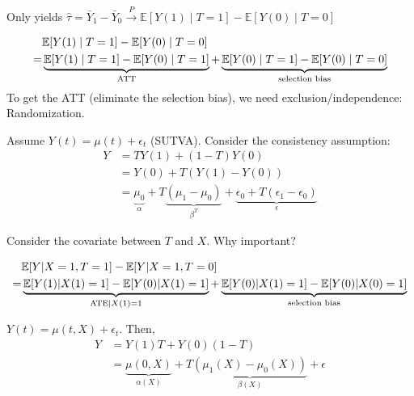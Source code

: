 \documentclass[11pt]{elegantbook}
\begin{document}
Only yields $\hat{\tau}=\bar{Y}_1-\bar{Y}_0\stackrel{P}{\longrightarrow} \mathbb{E}[Y(1)\mid T=1]-\mathbb{E}[Y(0)\mid T=0]$

\begin{equation}
    \begin{aligned}
        &\mathbb{E}[Y(1)\mid T=1]-\mathbb{E}[Y(0)\mid T=0]\\
        =&\underbrace{\mathbb{E}[Y(1)\mid T=1]-\mathbb{E}[Y(0)\mid T=1]}_{\textnormal{ATT}}+\underbrace{\mathbb{E}[Y(0)\mid T=1]-\mathbb{E}[Y(0)\mid T=0]}_{\textnormal{selection bias}}\\
    \end{aligned}
    \nonumber
\end{equation}
To get the ATT (eliminate the selection bias), we need exclusion/independence: Randomization.


Assume $Y(t)=\mu(t)+\epsilon_t$ (SUTVA). Consider the consistency assumption:
\begin{equation}
    \begin{aligned}
        Y&=TY(1)+(1-T)Y(0)\\
        &=Y(0)+T(Y(1)-Y(0))\\
        &=\underbrace{\mu_0}_\alpha+T\underbrace{(\mu_1-\mu_0)}_{\beta^T}+\underbrace{\epsilon_0+T(\epsilon_1-\epsilon_0)}_{\epsilon}
    \end{aligned}
    \nonumber
\end{equation}

Consider the covariate between $T$ and $X$. Why important?

\begin{equation}
    \begin{aligned}
        &\mathbb{E}[Y|X=1,T=1]-\mathbb{E}[Y|X=1,T=0]\\
        =& \underbrace{\mathbb{E}[Y(1)|X(1)=1]-\mathbb{E}[Y(0)|X(1)=1]}_{\textnormal{ATE}|X(1)=1} + \underbrace{\mathbb{E}[Y(0)|X(1)=1]-\mathbb{E}[Y(0)|X(0)=1]}_{\textnormal{selection bias}}\\
    \end{aligned}
    \nonumber
\end{equation}


$Y(t)=\mu(t,X)+\epsilon_t$. Then,
\begin{equation}
    \begin{aligned}
        Y&=Y(1)T+Y(0)(1-T)\\
        &=\underbrace{\mu(0,X)}_{\alpha(X)} + T\underbrace{(\mu_1(X)-\mu_0(X))}_{\beta(X)}+\epsilon
    \end{aligned}
    \nonumber
\end{equation}
\end{document}
